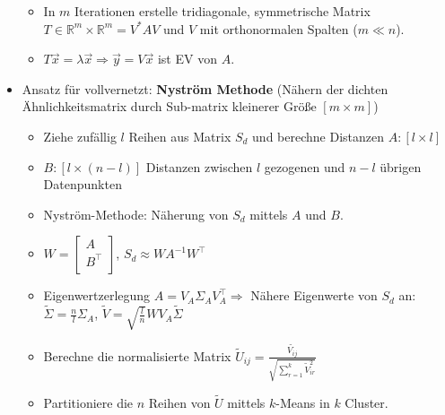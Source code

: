 \documentclass[11pt]{scrartcl}
\begin{document}
\begin{itemize}
    \begin{itemize}
        \item In $m$ Iterationen erstelle tridiagonale, symmetrische Matrix 
        $T \in \mathbb{R}^m \times \mathbb{R}^m = V^* A V$ und $V$ mit orthonormalen Spalten ($m \ll n$).
        \item $T\vec{x} = \lambda \vec{x} \Rightarrow \vec{y} = V \vec{x}$ ist EV von $A$.
    \end{itemize}
    \item Ansatz für vollvernetzt: \textbf{Nyström Methode} (Nähern der dichten Ähnlichkeitsmatrix durch
    Sub-matrix kleinerer Größe $[m \times m]$)
    \begin{itemize}
        \item Ziehe zufällig $l$ Reihen aus Matrix $S_d$ und berechne Distanzen $A : [l \times l]$
        \item $B : [l \times (n - l)]$ Distanzen zwischen $l$ gezogenen und $n - l$ 
        übrigen Datenpunkten
        \item Nyström-Methode: Näherung von $S_d$ mittels $A$ und $B$.
        \item $W = \left[\begin{matrix}A\\B^\top\\\end{matrix}\right]$, $S_d \approx W A^{-1} W^\top$
        \item Eigenwertzerlegung $A = V_A \Sigma_A V_A^\top \Rightarrow$ Nähere Eigenwerte von $S_d$ an: 
        $\tilde{\Sigma} = \frac{n}{l} \Sigma_A$, $\tilde{V} = \sqrt{\frac{l}{n}} W V_A \tilde{\Sigma}$
        \item Berechne die normalisierte Matrix $\tilde{U}_{ij} = 
        \frac{\tilde{V_{ij}}}{\sqrt{\sum_{r=1}^k \tilde{V}_{ir}^2}}$
        \item Partitioniere die $n$ Reihen von $\tilde{U}$ mittels $k$-Means in $k$ Cluster.
    \end{itemize}
\end{itemize}

\newpage
\end{document}
